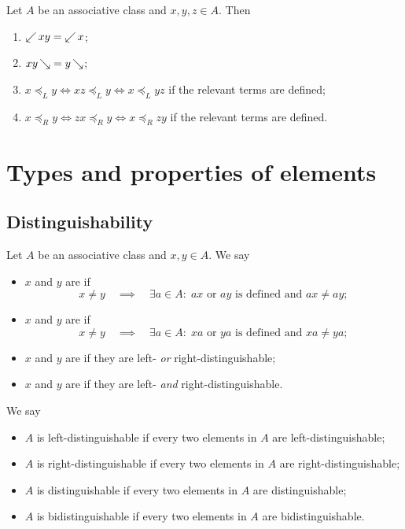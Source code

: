 \begin{lemma}
Let $A$ be an associative class and $x,y,z\in A$. Then
\begin{enumerate}
\item $\mathop{\swarrow}xy = \mathop{\swarrow}x$;
\item $xy\mathop{\searrow} = y\mathop{\searrow}$;
\item $x \preceq_L y \iff xz \preceq_L y \iff x \preceq_L yz$ if the relevant terms are defined;
\item $x \preceq_R y \iff zx \preceq_R y \iff x \preceq_R zy$ if the relevant terms are defined.
\end{enumerate}
\end{lemma}


\section{Types and properties of elements}
\subsection{Distinguishability}
\begin{definition}
Let $A$ be an associative class and $x,y\in A$. 
We say
\begin{itemize}
\item $x$ and $y$ are  if
\[ x\neq y \quad\implies\quad \exists a\in A: \;\text{$ax$ or $ay$ is defined and $ax \neq ay$}; \]
\item $x$ and $y$ are  if
\[ x\neq y \quad\implies\quad \exists a\in A: \; \text{$xa$ or $ya$ is defined and $xa \neq ya$}; \]
\item $x$ and $y$ are  if they are left- \emph{or} right-distinguishable;
\item $x$ and $y$ are  if they are left- \emph{and} right-distinguishable.
\end{itemize}
We say
\begin{itemize}
\item $A$ is left-distinguishable if every two elements in $A$ are left-distinguishable;
\item $A$ is right-distinguishable if every two elements in $A$ are right-distinguishable;
\item $A$ is distinguishable if every two elements in $A$ are distinguishable;
\item $A$ is bidistinguishable if every two elements in $A$ are bidistinguishable.
\end{itemize}
\end{definition}

